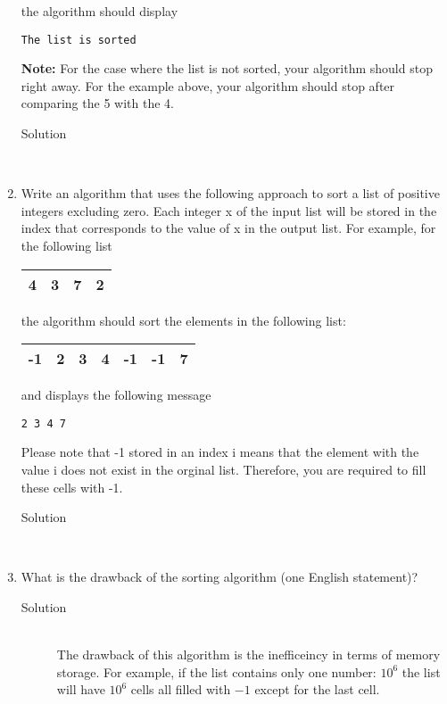 \documentclass[11pt,a4paper]{article}
\begin{document}
\begin{enumerate}[label=(\alph*)]
the algorithm should display
\begin{verbatim}
The list is sorted
\end{verbatim}
\textbf{Note:} For the case where the list is not sorted, your algorithm should stop right away. For the
example above, your algorithm should stop after comparing the 5 with the 4.
\begin{description}
  \item[Solution] \hfill \\
   
\end{description}
\newpage
\item Write an algorithm that uses the following approach to sort a list of positive integers excluding
zero. Each integer x of the input list will be stored in the index that corresponds to the value of x
in the output list.
For example, for the following list
\begin{center}
  \begin{tabular}{|c|c|c|c|}
    \hline
    4 & 3 & 7 & 2 \\
    \hline
  \end{tabular}
\end{center}
the algorithm should sort the elements in the following list:
\begin{center}
  \begin{tabular}{|c|c|c|c|c|c|c|}
    \hline
    -1 & 2 &3 & 4 & -1 & -1 & 7 \\
    \hline
  \end{tabular}
\end{center}
and displays the following message
\begin{verbatim}
2 3 4 7
\end{verbatim}
Please note that -1 stored in an index i means that the element with the value i does not exist in
the orginal list. Therefore, you are required to fill these cells with -1.
\newpage
\begin{description}
  \item[Solution] \hfill \\
  
\end{description}
\newpage
\item What is the drawback of the sorting algorithm (one English statement)?
\begin{description}
  \item[Solution] \hfill \\
  The drawback of this algorithm is the inefficeincy in terms of memory storage. For example, if the
list contains only one number: $ 10^6 $ the list will have $ 10^6 $ cells all filled with $ -1 $
except for the last cell.
\end{description}
\end{enumerate}
\end{document}
